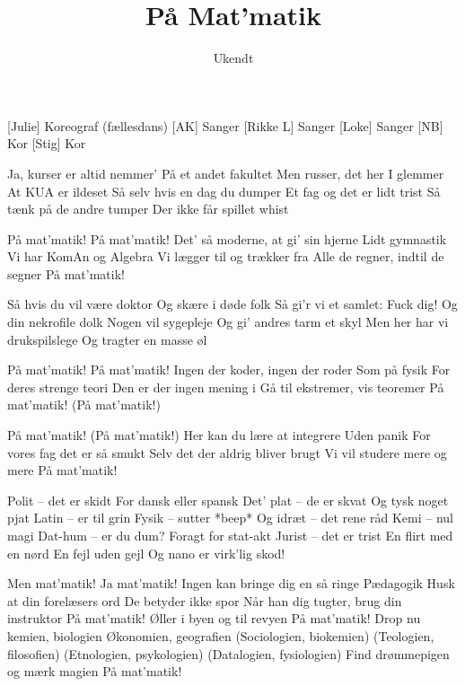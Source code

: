 \documentclass[a4paper,11pt]{article}
\title{På Mat'matik}
\author{Ukendt}
\begin{document}
\maketitle

\begin{roles}
[Julie] Koreograf (fællesdans)
[AK] Sanger
[Rikke L] Sanger
[Loke] Sanger
[NB] Kor
[Stig] Kor
\end{roles}

\begin{song}
 Ja, kurser er altid nemmer'
På et andet fakultet
Men russer, det her I glemmer
At KUA er ildeset
Så selv hvis en dag du dumper
Et fag og det er lidt trist
Så tænk på de andre tumper
Der ikke får spillet whist

 På mat'matik! På mat'matik!
Det' så moderne, at gi' sin hjerne
Lidt gymnastik
Vi har KomAn og Algebra
Vi lægger til og trækker fra
Alle de regner, indtil de segner
På mat'matik!

 Så hvis du vil være doktor
Og skære i døde folk
Så gi'r vi et samlet: Fuck dig!
Og din nekrofile dolk
Nogen vil sygepleje
Og gi' andres tarm et skyl
Men her har vi drukspilslege
Og tragter en masse øl

 På mat'matik! På mat'matik!
Ingen der koder, ingen der roder
Som på fysik
For deres strenge teori
Den er der ingen mening i
Gå til ekstremer, vis teoremer
På mat'matik! (På mat'matik!)

 På mat'matik! (På mat'matik!)
Her kan du lære at integrere
Uden panik
For vores fag det er så smukt
Selv det der aldrig bliver brugt
Vi vil studere mere og mere
På mat'matik!

 Polit -- det er skidt
For dansk eller spansk
Det' plat -- de er skvat
Og tysk noget pjat
Latin -- er til grin
Fysik -- sutter *beep*
Og idræt -- det rene råd
Kemi -- nul magi
Dat-hum -- er du dum?
Foragt for stat-akt
Jurist -- det er trist
En flirt med en nørd
En fejl uden gejl
Og nano er virk'lig skod!

 Men mat'matik! Ja mat'matik!
Ingen kan bringe dig en så ringe
Pædagogik
Husk at din forelæsers ord
De betyder ikke spor
Når han dig tugter, brug din instruktor
På mat'matik!
Øller i byen og til revyen
På mat'matik!
Drop nu kemien, biologien
Økonomien, geografien
(Sociologien, biokemien)
(Teologien, filosofien)
(Etnologien, psykologien)
(Datalogien, fysiologien)
Find drømmepigen og mærk magien
På mat'matik!
\end{song}
\end{document}
